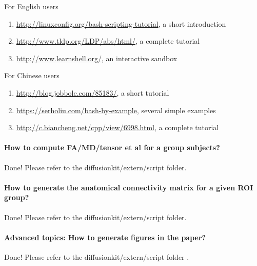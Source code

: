 \documentclass[letterpaper,10pt,english]{sphinxmanual}
\begin{document}
For English users
\begin{enumerate}
\item {} 
\href{http://linuxconfig.org/bash-scripting-tutorial}{http://linuxconfig.org/bash-scripting-tutorial}, a short introduction

\item {} 
\href{http://www.tldp.org/LDP/abs/html/}{http://www.tldp.org/LDP/abs/html/}, a complete tutorial

\item {} 
\href{http://www.learnshell.org/}{http://www.learnshell.org/}, an interactive sandbox

\end{enumerate}

For Chinese users
\begin{enumerate}
\item {} 
\href{http://blog.jobbole.com/85183/}{http://blog.jobbole.com/85183/}, a short tutorial

\item {} 
\href{https://serholiu.com/bash-by-example}{https://serholiu.com/bash-by-example}, several simple examples

\item {} 
\href{http://c.biancheng.net/cpp/view/6998.html}{http://c.biancheng.net/cpp/view/6998.html}, a complete tutorial

\end{enumerate}


\paragraph{How to compute FA/MD/tensor et al for a group subjects?}
\label{exampledata:how-to-compute-fa-md-tensor-et-al-for-a-group-subjects}
Done! Please refer to the diffusionkit/extern/script folder.


\paragraph{How to generate the anatomical connectivity matrix for a given ROI group?}
\label{exampledata:how-to-generate-the-anatomical-connectivity-matrix-for-a-given-roi-group}
Done! Please refer to the diffusionkit/extern/script folder.


\paragraph{Advanced topics: How to generate figures in the paper?}
\label{exampledata:advanced-topics-how-to-generate-figures-in-the-paper}
Done! Please refer to the diffusionkit/extern/script folder \footnotemark[1].
\end{document}
